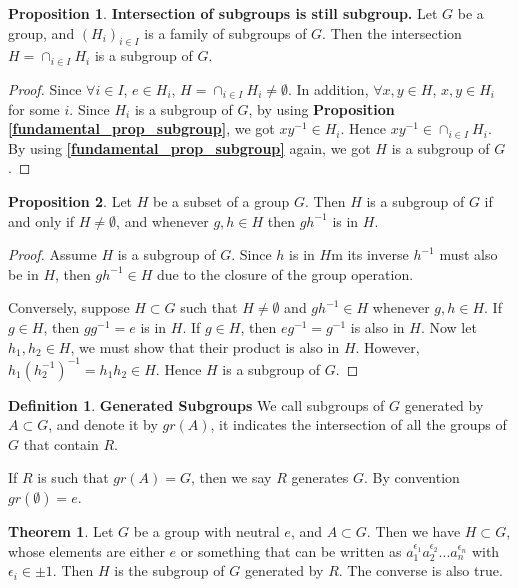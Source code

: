 \documentclass{article}
\theoremstyle{definition}
\newtheorem{defi}{Definition}[subsection]
\newtheorem{theorem}{Theorem}[subsection]
\newtheorem{prop}{Proposition}[subsection]
\begin{document}
\begin{prop}
\noindent\textbf{Intersection of subgroups is still subgroup.} Let $G$ be a group, and $(H_{i})_{i \in I}$ is a family of subgroups of $G$. Then the intersection $H = \cap_{i \in I}H_{i}$ is a subgroup of $G$.
\begin{proof}
Since $\forall i \in I$, $e \in H_{i}$, $H=\cap_{i \in I}H_{i} \neq \emptyset$. In addition, $\forall x,y \in H$, $x,y \in H_{i}$ for some $i$. Since $H_{i}$ is a subgroup of $G$, by using \textbf{Proposition \ref{fundamental_prop_subgroup}}, we got $xy^{-1} \in H_{i}$. Hence $xy^{-1} \in \cap_{i \in I}H_{i}$. By using \textbf{\ref{fundamental_prop_subgroup}} again, we got $H$ is a subgroup of $G$.
\end{proof}
\end{prop}

\begin{prop}
Let $H$ be a subset of a group $G$. Then $H$ is a subgroup of $G$ if and only if $H\neq \emptyset$, and whenever $g,h \in H$ then $gh^{-1}$ is in $H$.
\begin{proof}
Assume $H$ is a subgroup of $G$. Since $h$ is in $H$m its inverse $h^{-1}$ must also be in $H$, then $gh^{-1}\in H$ due to the closure of the group operation.

Conversely, suppose $H\subset G$ such that $H\neq\emptyset$ and $gh^{-1}\in H$ whenever $g,h \in H$. If $g\in H$, then $gg^{-1}=e$ is in $H$. If $g\in H$, then $eg^{-1}=g^{-1}$ is also in $H$. Now let $h_1, h_2\in H$, we must show that their product is also in $H$. However, $h_1(h_2^{-1})^{-1}=h_1h_2\in H$. Hence $H $ is a subgroup of $G$.
\end{proof}
\end{prop}
\begin{defi}
\textbf{Generated Subgroups} We call subgroups of $G$ generated by $A\subset G$, and denote it by $gr(A)$, it indicates the intersection of all the groups of $G$ that contain $R$.

If $R$ is such that $gr(A) = G$, then we say $R$ generates $G$. By convention $gr(\emptyset)={e}$.
\end{defi}
\begin{theorem}
Let $G$ be a group with neutral $e$, and $A\subset G$. Then we have $H\subset G$, whose elements are either $e$ or something that can be written as $a_1^{\epsilon_1}a_2^{\epsilon_2}...a_n^{\epsilon_n}$ with $\epsilon_i\in {\pm1}$. Then $H$ is the subgroup of $G$ generated by $R$. The converse is also true.
\end{theorem}
\end{document}
